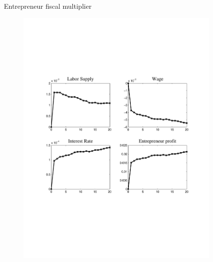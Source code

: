 \documentclass[svgnames]{beamer}
\begin{document}
\begin{frame}{Entrepreneur fiscal multiplier}
\begin{figure}[!ht]
\includegraphics[trim=1cm 6.5cm 1cm 6.5cm, clip=true, width=0.9\textwidth]{graph/GShockMechanism.pdf}
\end{figure}
\end{frame}
\end{document}
